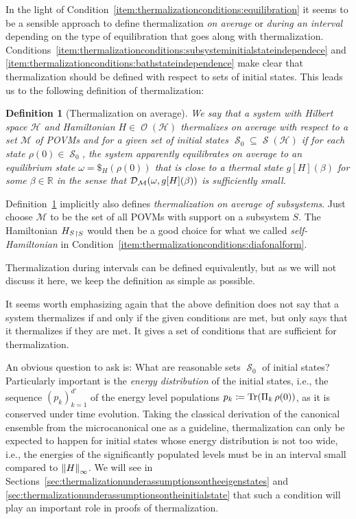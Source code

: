 \documentclass[a4paper,12pt,listof=totoc,index=totoc,bibliography=totoc,headsepline=false,headings=normal,BCOR16.153846mm,DIV12,headinclude,twoside,cleardoublepage=empty,numbers=noenddot,final]{scrreprt}
\theoremstyle{mystyle}
\numberwithin{equation}{section}
\numberwithin{figure}{section}
\numberwithin{lemma}{section}
\numberwithin{theorem}{section}
\numberwithin{corollary}{section}
\newtheorem{definition}{Definition}
\numberwithin{definition}{section}
\numberwithin{conjecture}{section}
\numberwithin{observation}{section}
\newcommand{\+}{\mkern2mu}
\newcommand{\coloneqq}{\mathrel{\vcentcolon\mkern-1.2mu=}} %
\renewcommand{\H}{H}
\newcommand{\rhog}{g}
\newcommand{\norm}[2][]{
  \ifthenelse{\equal{#1}{}}
    {\left\| {#2} \right\|}
    {\ifthenelse{\equal{#1}{uinv}}
      {\left\vert\kern-0.25ex\left\vert\kern-0.25ex\left\vert {#2} \right\vert\kern-0.25ex\right\vert\kern-0.25ex\right\vert}
      {\left\| {#2} \right\|_{#1}}
    }
}
\newcommand{\tracedistance}[3][]{
  \ifthenelse{\equal{#2}{}}
  {\ifthenelse{\equal{#3}{}}
    {\mathcal{D}_{#1}}{}
  }{
    \ifthenelse{\equal{#1}{}}
    {\operatorname{\mathcal{D}}(#2,#3)}
    {\operatorname{\mathcal{D}}_{#1}(#2,#3)}
  }
}
\newcommand{\trunc}[2]{{#1}_{\upharpoonright \mathnormal{#2}}}
\DeclareMathOperator{\1}{\mathds{1}}
\newcommand{\POVMs}{\mathcal{M}}
\DeclareMathOperator{\Obs}{\mathcal{O}}
\DeclareMathOperator{\Qst}{\mathcal{S}}
\DeclareMathOperator{\Tr}{Tr}
\newcommand{\mc}[1]{\mathcal{#1}}
\newcommand{\mcH}{\mc{H}}
\newcommand{\mb}[1]{\mathbb{#1}}
\newcommand{\R}{\mb{R}}
\begin{document}
In the light of Condition~\ref{item:thermalizationconditions:equilibration} it seems to be a sensible approach to define thermalization \emph{on average} or \emph{during an interval} depending on the type of equilibration that goes along with thermalization.
Conditions~\ref{item:thermalizationconditions:subsysteminitialstateindependece} and \ref{item:thermalizationconditions:bathstateindependence} make clear that thermalization should be defined with respect to sets of initial states.
This leads us to the following definition of thermalization:
\begin{definition}[Thermalization on average] \label{def:thermlaizationonaverage}
  We say that a system with Hilbert space $\mcH$ and Hamiltonian $\H \in \Obs(\mcH)$ \emph{thermalizes} on average with respect to a set $\POVMs$ of POVMs and for a given set of initial states $\Qst_0 \subseteq \Qst(\mcH)$ if for each state $\rho(0) \in \Qst_0$, the system apparently equilibrates on average to an equilibrium state $\omega = \$_\H(\rho(0))$ that is close to a thermal state $\rhog[\H](\beta)$ for some $\beta \in \R$ in the sense that $\tracedistance[\POVMs]{\omega}{\rhog[\H](\beta)}$ is sufficiently small.
\end{definition}

Definition~\ref{def:thermlaizationonaverage} implicitly also defines \emph{thermalization on average of subsystems}.
Just choose $\POVMs$ to be the set of all POVMs with support on a subsystem $S$.
The Hamiltonian $\trunc {\H_S} S$ would then be a good choice for what we called \emph{self-Hamiltonian} in Condition~\ref{item:thermalizationconditions:diafonalform}.

Thermalization during intervals can be defined equivalently, but as we will not discuss it here, we keep the definition as simple as possible.

It seems worth emphasizing again that the above definition does not say that a system thermalizes if and only if the given conditions are met, but only says that it thermalizes if they are met.
It gives a set of conditions that are sufficient for thermalization.

An obvious question to ask is:
What are reasonable sets $\Qst_0$ of initial states?
Particularly important is the \emph{energy distribution} of the initial states, i.e., the sequence $(p_k)_{k=1}^{d'}$ of the energy level populations $p_k \coloneqq \Tr(\Pi_k\,\rho(0))$, as it is conserved under time evolution.
Taking the classical derivation of the canonical ensemble from the microcanonical one as a guideline, thermalization can only be expected to happen for initial states whose energy distribution is not too wide, i.e., the energies of the significantly populated levels must be in an interval small compared to $\norm[\infty]\H$. 
We will see in Sections~\ref{sec:thermalizationunderassumptionsontheeigenstates} and \ref{sec:thermalizationunderassumptionsontheinitialstate} that such a condition will play an important role in proofs of thermalization.
\end{document}
